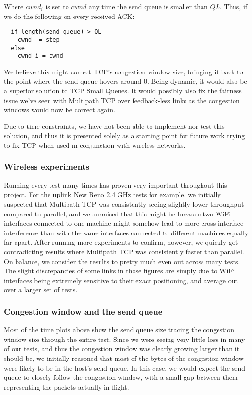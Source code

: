 Where $cwnd_i$ is set to $cwnd$ any time the send queue is smaller than $QL$.
Thus, if we do the following on every received ACK:

\begin{verbatim}
  if length(send queue) > QL
    cwnd -= step
  else
    cwnd_i = cwnd
\end{verbatim}

We believe this might correct TCP's congestion window size, bringing it back to
the point where the send queue hovers around 0. Being dynamic, it would also be
a superior solution to TCP Small Queues. It would possibly also fix the fairness
issue we've seen with Multipath TCP over feedback-less links as the congestion
windows would now be correct again.

Due to time constraints, we have not been able to implement nor test this
solution, and thus it is presented solely as a starting point for future work
trying to fix TCP when used in conjunction with wireless networks.

\subsubsection{Wireless experiments}
Running every test many times has proven very important throughout this project.
For the uplink New Reno 2.4 GHz tests for example, we initially suspected that
Multipath TCP was consistently seeing slightly lower throughput compared to
parallel, and we surmised that this might be because two WiFi interfaces
connected to one machine might somehow lead to more cross-interface interference
than with the same interfaces connected to different machines equally far apart.
After running more experiments to confirm, however, we quickly got contradicting
results where Multipath TCP was consistently faster than parallel. On balance,
we consider the results to pretty much even out across many tests. The slight
discrepancies of some links in those figures are simply due to WiFi interfaces
being extremely sensitive to their exact positioning, and average out over a
larger set of tests.

\subsubsection{Congestion window and the send queue}
Most of the time plots above show the send queue size tracing the congestion
window size through the entire test. Since we were seeing very  little loss in
many of our tests, and thus the congestion window was clearly growing larger
than it should be, we initially reasoned that most of the bytes of the
congestion window were likely to be in the host's send queue. In this case, we
would expect the send queue to closely follow the congestion window, with a
small gap between them representing the packets actually in flight.

